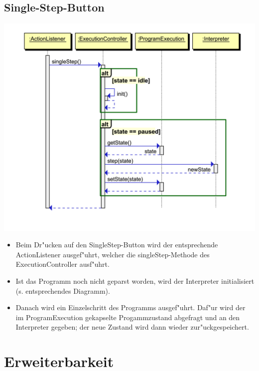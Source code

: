\documentclass[10pt,a4paper,titlepage]{article}
\begin{document}
\subsection{Single-Step-Button}
\includegraphics[scale=0.9]{images/Button_singleStep.pdf} \newline
\begin{itemize}
\item Beim Dr"ucken auf den SingleStep-Button wird der entsprechende ActionListener ausgef"uhrt, welcher die singleStep-Methode des ExecutionController ausf"uhrt.
\item Ist das Programm noch nicht geparst worden, wird der Interpreter initialisiert (s. entsprechendes Diagramm).
\item Danach wird ein Einzelschritt des Programms ausgef"uhrt. Daf"ur wird der im ProgramExecution gekapselte Progammzustand abgefragt und an den Interpreter gegeben; der neue Zustand wird dann wieder zur"uckgespeichert.
\end{itemize}

\newpage
\section{Erweiterbarkeit}

\end{document}
